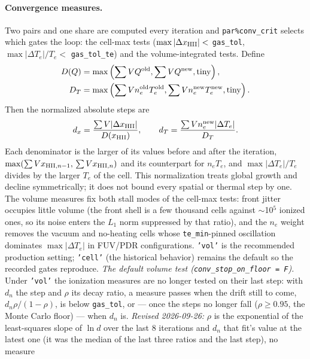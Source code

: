 \documentclass[english,a4paper]{my_memo}
\newcommand{\code}[1]{\texttt{#1}}
\begin{document}
\paragraph{Convergence measures.}\label{sec:conv}  Two pairs and one share are
computed every iteration and \code{par\%conv\_crit} selects which gates the loop:
the cell-max tests ($\max|\Delta x_{\rm HII}| <$ \code{gas\_tol},
$\max|\Delta T_e|/T_e <$ \code{gas\_tol\_te}) and the
volume-integrated tests.  Define
\[
\begin{aligned}
 D(Q)&=\max\left(\sum VQ^{\rm old},\sum VQ^{\rm new},\mathrm{tiny}\right),\\
 D_T&=\max\left(\sum Vn_e^{\rm old}T_e^{\rm old},
                     \sum Vn_e^{\rm new}T_e^{\rm new},\mathrm{tiny}\right).
\end{aligned}
\]
Then the normalized absolute steps are
\begin{equation}
 d_x=\frac{\sum V|\Delta x_{\rm HII}|}{D(x_{\rm HII})},\qquad
 d_T=\frac{\sum Vn_e^{\rm new}|\Delta T_e|}{D_T}.
\end{equation}
Each denominator is the larger of its values before and after the
iteration, $\max(\sum V x_{{\rm HII},n-1},\,\sum V x_{{\rm HII},n})$ and its
counterpart for $n_e T_e$, and $\max|\Delta T_e|/T_e$ divides by the larger
$T_e$ of the cell.  This normalization treats global growth and decline
symmetrically; it does not bound every spatial or thermal step by one.
The volume measures fix both stall modes of the cell-max tests: front
jitter occupies little volume (the front shell is a few thousand cells
against $\sim$10$^5$ ionized ones, so its noise enters the $L_1$ norm
suppressed by that ratio), and the $n_e$ weight removes the vacuum and
no-heating cells whose \code{te\_min}-pinned oscillation dominates
$\max|\Delta T_e|$ in FUV/PDR configurations.  \code{'vol'} is the
recommended production setting; \code{'cell'} (the historical
behavior) remains the default so the recorded gates reproduce.
\emph{The default volume test (\code{conv\_stop\_on\_floor = F}).}
Under \code{'vol'} the ionization
measures are no longer tested on their last step: with $d_n$ the step and
$\rho$ its decay ratio, a measure passes when the drift still to come,
$d_n\rho/(1-\rho)$, is below \code{gas\_tol}, or --- once the steps no
longer fall ($\rho \ge 0.95$, the Monte Carlo floor) --- when $d_n$ is.
\emph{Revised 2026-09-26:} $\rho$ is the exponential of the least-squares slope of $\ln d$
over the last 8 iterations and $d_n$ that fit's value at the latest one (it
was the median of the last three ratios and the last step), no measure
\end{document}
